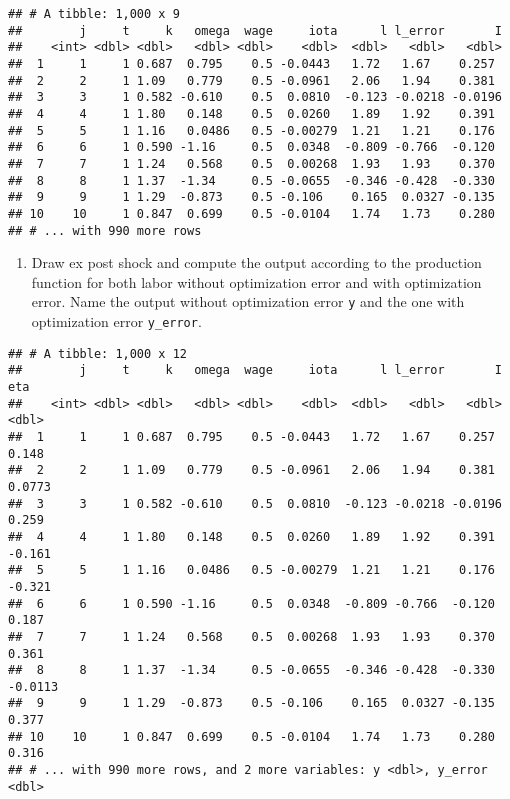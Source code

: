 \documentclass[
]{book}
\providecommand{\tightlist}{%
  \setlength{\itemsep}{0pt}\setlength{\parskip}{0pt}}
\begin{document}
\begin{verbatim}
## # A tibble: 1,000 x 9
##        j     t     k   omega  wage     iota      l l_error       I
##    <int> <dbl> <dbl>   <dbl> <dbl>    <dbl>  <dbl>   <dbl>   <dbl>
##  1     1     1 0.687  0.795    0.5 -0.0443   1.72   1.67    0.257 
##  2     2     1 1.09   0.779    0.5 -0.0961   2.06   1.94    0.381 
##  3     3     1 0.582 -0.610    0.5  0.0810  -0.123 -0.0218 -0.0196
##  4     4     1 1.80   0.148    0.5  0.0260   1.89   1.92    0.391 
##  5     5     1 1.16   0.0486   0.5 -0.00279  1.21   1.21    0.176 
##  6     6     1 0.590 -1.16     0.5  0.0348  -0.809 -0.766  -0.120 
##  7     7     1 1.24   0.568    0.5  0.00268  1.93   1.93    0.370 
##  8     8     1 1.37  -1.34     0.5 -0.0655  -0.346 -0.428  -0.330 
##  9     9     1 1.29  -0.873    0.5 -0.106    0.165  0.0327 -0.135 
## 10    10     1 0.847  0.699    0.5 -0.0104   1.74   1.73    0.280 
## # ... with 990 more rows
\end{verbatim}

\begin{enumerate}
\def\labelenumi{\arabic{enumi}.}
\setcounter{enumi}{7}
\tightlist
\item
  Draw ex post shock and compute the output according to the production function for both labor without optimization error and with optimization error. Name the output without optimization error \texttt{y} and the one with optimization error \texttt{y\_error}.
\end{enumerate}

\begin{verbatim}
## # A tibble: 1,000 x 12
##        j     t     k   omega  wage     iota      l l_error       I     eta
##    <int> <dbl> <dbl>   <dbl> <dbl>    <dbl>  <dbl>   <dbl>   <dbl>   <dbl>
##  1     1     1 0.687  0.795    0.5 -0.0443   1.72   1.67    0.257   0.148 
##  2     2     1 1.09   0.779    0.5 -0.0961   2.06   1.94    0.381   0.0773
##  3     3     1 0.582 -0.610    0.5  0.0810  -0.123 -0.0218 -0.0196  0.259 
##  4     4     1 1.80   0.148    0.5  0.0260   1.89   1.92    0.391  -0.161 
##  5     5     1 1.16   0.0486   0.5 -0.00279  1.21   1.21    0.176  -0.321 
##  6     6     1 0.590 -1.16     0.5  0.0348  -0.809 -0.766  -0.120   0.187 
##  7     7     1 1.24   0.568    0.5  0.00268  1.93   1.93    0.370   0.361 
##  8     8     1 1.37  -1.34     0.5 -0.0655  -0.346 -0.428  -0.330  -0.0113
##  9     9     1 1.29  -0.873    0.5 -0.106    0.165  0.0327 -0.135   0.377 
## 10    10     1 0.847  0.699    0.5 -0.0104   1.74   1.73    0.280   0.316 
## # ... with 990 more rows, and 2 more variables: y <dbl>, y_error <dbl>
\end{verbatim}
\end{document}
